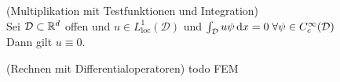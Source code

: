 \begin{Satz}(Multiplikation mit Testfunktionen und Integration) \\
	\label{testfunktionen}
	Sei $\mathcal{D} \subset \mathbb{R}^d$ offen und $u \in L_{\text{loc}}^1(\mathcal{D})$ und $\int_{\mathcal{D}} u \psi \, \mathrm{d} x = 0 \; \forall \psi \in C_c^{\infty}(\mathcal{D})$ \\
	Dann gilt $ u \equiv 0 $.
\end{Satz}
\begin{Satz} (Rechnen mit Differentialoperatoren)
	todo FEM
\end{Satz}
